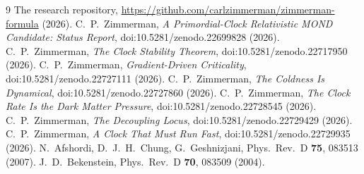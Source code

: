 \documentclass[11pt,letterpaper]{article}
\begin{document}
\begin{thebibliography}{9}
 The research repository, \url{https://github.com/carlzimmerman/zimmerman-formula} (2026).
 C.~P.~Zimmerman, \emph{A Primordial-Clock Relativistic MOND Candidate: Status Report}, doi:10.5281/zenodo.22699828 (2026).
 C.~P.~Zimmerman, \emph{The Clock Stability Theorem}, doi:10.5281/zenodo.22717950 (2026).
 C.~P.~Zimmerman, \emph{Gradient-Driven Criticality}, doi:10.5281/zenodo.22727111 (2026).
 C.~P.~Zimmerman, \emph{The Coldness Is Dynamical}, doi:10.5281/zenodo.22727860 (2026).
 C.~P.~Zimmerman, \emph{The Clock Rate Is the Dark Matter Pressure}, doi:10.5281/zenodo.22728545 (2026).
 C.~P.~Zimmerman, \emph{The Decoupling Locus}, doi:10.5281/zenodo.22729429 (2026).
 C.~P.~Zimmerman, \emph{A Clock That Must Run Fast}, doi:10.5281/zenodo.22729935 (2026).
 N.~Afshordi, D.~J.~H.~Chung, G.~Geshnizjani, Phys.\ Rev.\ D \textbf{75}, 083513 (2007).
 J.~D.~Bekenstein, Phys.\ Rev.\ D \textbf{70}, 083509 (2004).
\end{thebibliography}
\end{document}
